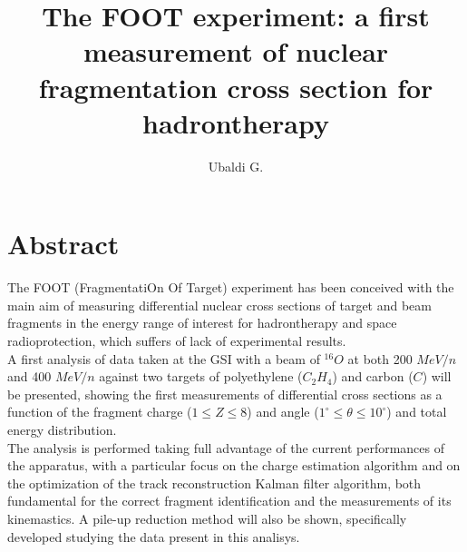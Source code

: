 \documentclass{article}
\title{The FOOT experiment: a first measurement of nuclear fragmentation cross section for hadrontherapy}
\author{Ubaldi G.%
	}
\begin{document}
\maketitle



\section{Abstract}

The FOOT (FragmentatiOn Of Target) experiment has been conceived with the main aim of measuring differential nuclear cross sections of target and beam fragments in the energy range of interest for hadrontherapy and space radioprotection, which suffers of lack of experimental results.\\
A first analysis of data taken at the GSI with a beam of $^{16}O$ at both 200 $MeV/n$ and 400 $MeV/n$ against two targets of polyethylene ($C_2H_4$) and carbon ($C$) will be presented, showing the first measurements of differential cross sections as a function of the fragment charge ($ 1 \leq Z \leq 8$) and angle ($ 1 ^{\circ} \leq \theta \leq 10 ^{\circ}$) and total energy distribution. \\
The analysis is performed taking full advantage of the current performances of the apparatus, with a particular focus on the charge estimation algorithm and on the optimization of the track reconstruction Kalman filter algorithm, both fundamental for the correct fragment identification and the measurements of its kinemastics. A pile-up reduction method will also be shown, specifically developed studying the data present in this analisys.







\end{document}
